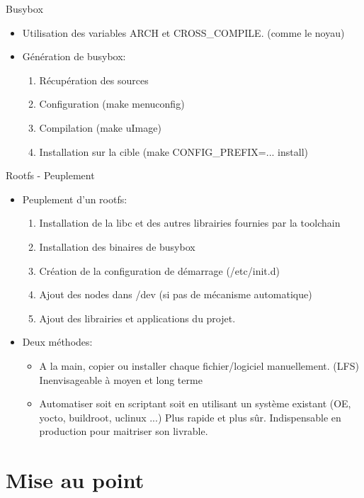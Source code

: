 \begin{frame}{Busybox}{}
  \begin{itemize}
  \item Utilisation des variables ARCH et CROSS\_COMPILE. (comme le noyau)
  \item Génération de busybox:
    \begin{enumerate}
    \item Récupération des sources
    \item Configuration (make menuconfig)
    \item Compilation (make uImage)
    \item Installation sur la cible (make CONFIG\_PREFIX=... install)
    \end{enumerate}
  \end{itemize}
\end{frame}

\begin{frame}{Rootfs - Peuplement}
  \begin{itemize}
  \item Peuplement d'un rootfs:
    \begin{enumerate}
    \item Installation de la libc et des autres librairies fournies par la toolchain
    \item Installation des binaires de busybox
    \item Création de la configuration de démarrage (/etc/init.d)
    \item Ajout des nodes dans /dev (si pas de mécanisme automatique)
    \item Ajout des librairies et applications du projet.
    \end{enumerate}
  \item Deux méthodes:
    \begin{itemize}
    \item A la main, copier ou installer chaque fichier/logiciel manuellement. (LFS) \MVRightarrow Inenvisageable à moyen et long terme
    \item Automatiser soit en scriptant soit en utilisant un système existant (OE, yocto, buildroot, uclinux ...) \MVRightarrow Plus rapide et plus sûr. Indispensable en production pour maitriser son livrable.
    \end{itemize}
  \end{itemize}
\end{frame}

\section{Mise au point}

